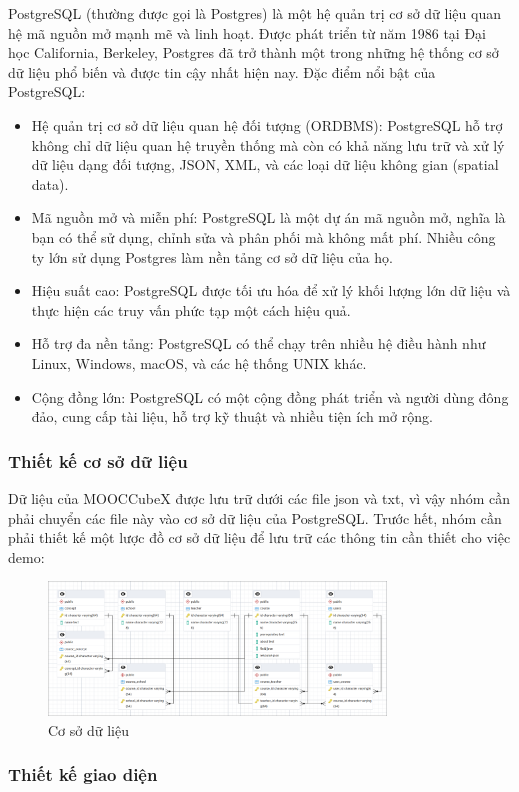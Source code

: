 PostgreSQL (thường được gọi là Postgres) là một hệ quản trị cơ sở dữ liệu quan
hệ mã nguồn mở mạnh mẽ và linh hoạt. Được phát triển từ năm 1986 tại Đại học
California, Berkeley, Postgres đã trở thành một trong những hệ thống cơ sở dữ
liệu phổ biến và được tin cậy nhất hiện nay. Đặc điểm nổi bật của PostgreSQL:
\begin{itemize}
    \item Hệ quản trị cơ sở dữ liệu quan hệ đối tượng (ORDBMS): PostgreSQL hỗ
        trợ không chỉ dữ liệu quan hệ truyền thống mà còn có khả năng lưu trữ và xử lý dữ liệu dạng đối tượng, JSON, XML, và các loại dữ liệu không gian (spatial data).

    \item Mã nguồn mở và miễn phí: PostgreSQL là một dự án mã nguồn mở, nghĩa
        là bạn có thể sử dụng, chỉnh sửa và phân phối mà không mất phí. Nhiều công ty lớn sử dụng Postgres làm nền tảng cơ sở dữ liệu của họ.

    \item Hiệu suất cao: PostgreSQL được tối ưu hóa để xử lý khối lượng lớn dữ
        liệu và thực hiện các truy vấn phức tạp một cách hiệu quả.

    \item Hỗ trợ đa nền tảng: PostgreSQL có thể chạy trên nhiều hệ điều hành
        như Linux, Windows, macOS, và các hệ thống UNIX khác.

    \item Cộng đồng lớn: PostgreSQL có một cộng đồng phát triển và người dùng
        đông đảo, cung cấp tài liệu, hỗ trợ kỹ thuật và nhiều tiện ích mở rộng.
\end{itemize}

\subsubsection{Thiết kế cơ sở dữ liệu}

Dữ liệu của MOOCCubeX được lưu trữ dưới các file json và txt, vì vậy nhóm cần
phải chuyển các file này vào cơ sở dữ liệu của PostgreSQL. Trước hết, nhóm cần phải
thiết kế một lược đồ cơ sở dữ liệu để lưu trữ các thông tin cần thiết cho việc demo:

\begin{figure}[h]
    \centering
    \includegraphics[width=0.8\textwidth]{figures/72.png}
    \caption{Cơ sở dữ liệu}
\end{figure}

\subsubsection{Thiết kế giao diện}

